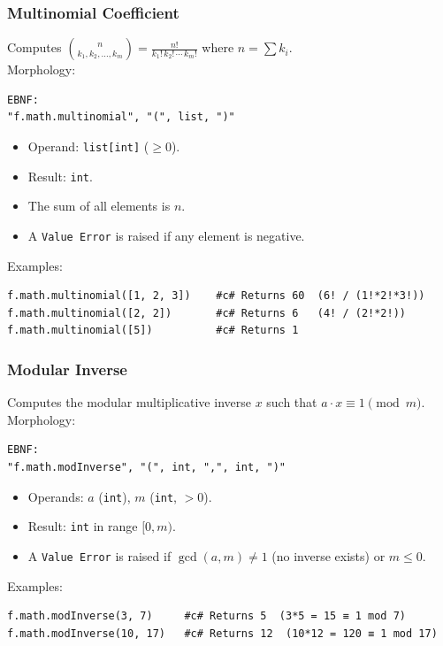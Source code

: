 \subsubsection{Multinomial Coefficient}
Computes $\binom{n}{k_1, k_2, \ldots, k_m} = \frac{n!}{k_1!\, k_2!\, \cdots\, k_m!}$ where $n = \sum k_i$. \\
Morphology:
\begin{verbatim}
EBNF:
"f.math.multinomial", "(", list, ")"
\end{verbatim}
\begin{itemize}
\item Operand: \texttt{list[int]} ($\geq 0$).
\item Result: \texttt{int}.
\item The sum of all elements is $n$.
\item A \texttt{Value Error} is raised if any element is negative.
\end{itemize}
Examples:
\begin{verbatim}
f.math.multinomial([1, 2, 3])    #c# Returns 60  (6! / (1!*2!*3!))
f.math.multinomial([2, 2])       #c# Returns 6   (4! / (2!*2!))
f.math.multinomial([5])          #c# Returns 1
\end{verbatim}

\subsubsection{Modular Inverse}
Computes the modular multiplicative inverse $x$ such that $a \cdot x \equiv 1 \pmod{m}$. \\
Morphology:
\begin{verbatim}
EBNF:
"f.math.modInverse", "(", int, ",", int, ")"
\end{verbatim}
\begin{itemize}
\item Operands: $a$ (\texttt{int}), $m$ (\texttt{int}, $> 0$).
\item Result: \texttt{int} in range $[0, m)$.
\item A \texttt{Value Error} is raised if $\gcd(a, m) \neq 1$ (no inverse exists) or $m \leq 0$.
\end{itemize}
Examples:
\begin{verbatim}
f.math.modInverse(3, 7)     #c# Returns 5  (3*5 = 15 ≡ 1 mod 7)
f.math.modInverse(10, 17)   #c# Returns 12  (10*12 = 120 ≡ 1 mod 17)
\end{verbatim}

